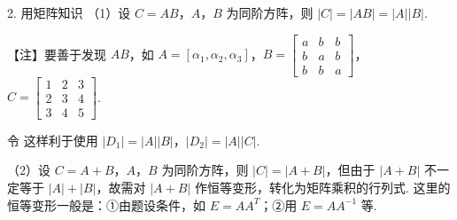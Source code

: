 \begin{fcard}{2. 用矩阵知识}
（1）设 $C=AB$，$A$，$B$ 为同阶方阵，则 $|C|=|AB|=|A||B|$.
\end{fcard}

\begin{fnote}
【注】要善于发现 $AB$，如 $A=[\alpha_1,\alpha_2,\alpha_3]$，$B=\begin{bmatrix}a & b & b\\ b & a & b\\ b & b & a\end{bmatrix}$，$C=\begin{bmatrix}1 & 2 & 3\\ 2 & 3 & 4\\ 3 & 4 & 5\end{bmatrix}$.

令
这样利于使用 $|D_1|=|A||B|$，$|D_2|=|A||C|$.
\end{fnote}

（2）设 $C=A+B$，$A$，$B$ 为同阶方阵，则 $|C|=|A+B|$，但由于 $|A+B|$ 不一定等于 $|A|+|B|$，故需对 $|A+B|$ 作恒等变形，转化为矩阵乘积的行列式. 这里的恒等变形一般是：①由题设条件，如 $E=AA^{T}$；②用 $E=AA^{-1}$ 等.




